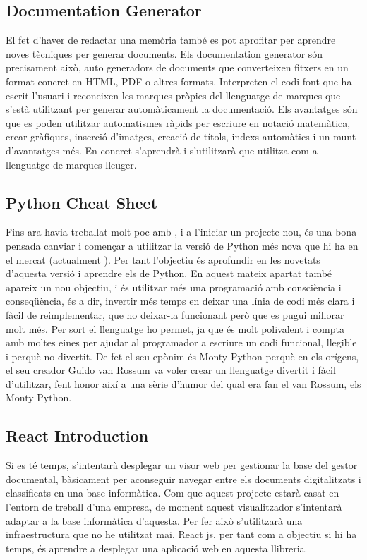 \documentclass[letterpaper,11pt,catalan]{sphinxmanual}
\begin{document}
\subsection{Documentation Generator}
\label{\detokenize{index:documentation-generator}}
El fet d'haver de redactar una memòria també es pot aprofitar per aprendre noves tècniques per
generar documents. Els documentation generator són precisament això, auto generadors
de documents que converteixen fitxers en un format concret en HTML, PDF o altres formats. Interpreten
el codi font que ha escrit l'usuari i reconeixen les marques pròpies del llenguatge de marques que s'està
utilitzant per generar automàticament la documentació. Els avantatges són que es poden utilitzar automatismes ràpids
per escriure en notació matemàtica, crear gràfiques, inserció d'imatges, creació de títols, indexs
automàtics i un munt d'avantatges més. En concret s'aprendrà i s'utilitzarà  que utilitza
 com a llenguatge de marques lleuger.


\subsection{Python Cheat Sheet}
\label{\detokenize{index:python-cheat-sheet}}
Fins ara havia treballat molt poc amb , i a l'iniciar un projecte nou, és una bona pensada
canviar i començar a utilitzar la versió de Python més nova que hi ha en el mercat (actualment ).
Per tant l'objectiu és aprofundir en les novetats d'aquesta versió i aprendre els  de Python.
En aquest mateix apartat també apareix un nou objectiu, i és utilitzar més una programació amb consciència i
conseqüència, és a dir, invertir més temps en deixar una línia de codi més clara i fàcil de reimplementar,
que no deixar-la funcionant però que es pugui millorar molt més. Per sort el llenguatge ho permet, ja que és
molt polivalent i compta amb moltes eines per ajudar al programador a escriure un codi funcional, llegible
i perquè no divertit. De fet el seu epònim és Monty Python perquè en els orígens, el seu creador Guido van
Rossum va voler crear un llenguatge divertit i fàcil d'utilitzar, fent honor així a una sèrie d'humor del
qual era fan el van Rossum, els Monty Python.


\subsection{React Introduction}
\label{\detokenize{index:react-introduction}}
Si es té temps, s'intentarà desplegar un \sphinxquotedblleft{}visor\sphinxquotedblright{} web per gestionar la base del gestor documental, bàsicament
per aconseguir navegar entre els documents digitalitzats i classificats en una base informàtica. Com que
aquest projecte estarà casat en l'entorn de treball d'una empresa, de moment aquest visualitzador s'intentarà
adaptar a la base informàtica d'aquesta. Per fer això s'utilitzarà una infraestructura que no he utilitzat
mai, React js, per tant com a objectiu si hi ha temps, és aprendre a desplegar una aplicació web en aquesta llibreria.
\end{document}
